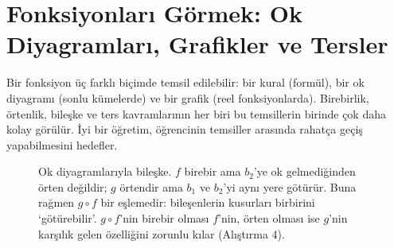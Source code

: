 \section{Fonksiyonları Görmek: Ok Diyagramları, Grafikler ve Tersler}

Bir fonksiyon üç farklı biçimde temsil edilebilir: bir kural (formül), bir ok diyagramı (sonlu kümelerde) ve bir grafik (reel fonksiyonlarda). Birebirlik, örtenlik, bileşke ve ters kavramlarının her biri bu temsillerin birinde çok daha kolay görülür. İyi bir öğretim, öğrencinin temsiller arasında rahatça geçiş yapabilmesini hedefler.

\begin{figure}[htbp]
\centering
{}
\caption{Ok diyagramlarıyla bileşke. $f$ birebir ama $b_2$’ye ok gelmediğinden örten değildir; $g$ örtendir ama $b_1$ ve $b_2$’yi aynı yere götürür. Buna rağmen $g\circ f$ bir eşlemedir: bileşenlerin kusurları birbirini ‘götürebilir’. $g\circ f$’nin birebir olması $f$’nin, örten olması ise $g$’nin karşılık gelen özelliğini zorunlu kılar (Alıştırma 4).}
\end{figure}

